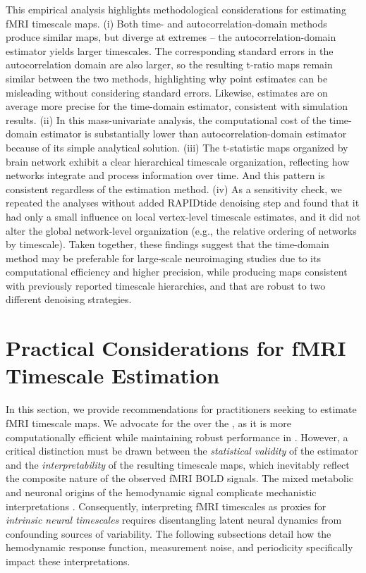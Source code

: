 \documentclass[9pt]{article}
\begin{document}
This empirical analysis highlights methodological considerations for estimating fMRI timescale maps. (i) Both time- and autocorrelation-domain methods produce similar maps, but diverge at extremes -- the autocorrelation-domain estimator yields larger timescales. The corresponding standard errors in the autocorrelation domain are also larger, so the resulting t-ratio maps remain similar between the two methods, highlighting why point estimates can be misleading without considering standard errors.  Likewise, estimates are on average more precise for the time-domain estimator, consistent with simulation results.  (ii) In this mass-univariate analysis, the computational cost of the time-domain estimator is substantially lower than autocorrelation-domain estimator because of its simple analytical solution. (iii) The t-statistic maps organized by brain network exhibit a clear hierarchical timescale organization, reflecting how networks integrate and process information over time. And this pattern is consistent regardless of the estimation method. (iv) As a sensitivity check, we repeated the analyses without added RAPIDtide denoising step and found that it had only a small influence on local vertex-level timescale estimates, and it did not alter the global network-level organization (e.g., the relative ordering of networks by timescale). Taken together, these findings suggest that the time-domain method may be preferable for large-scale neuroimaging studies due to its computational efficiency and higher precision, while producing maps consistent with previously reported timescale hierarchies, and that are robust to two different denoising strategies.

\section{Practical Considerations for fMRI Timescale Estimation}\label{sec:practical-considerations}

In this section, we provide recommendations for practitioners seeking to estimate fMRI timescale maps. We advocate for the  over the , as it is more computationally efficient while maintaining robust performance in . However, a critical distinction must be drawn between the \textit{statistical validity} of the estimator and the \textit{interpretability} of the resulting timescale maps, which inevitably reflect the composite nature of the observed fMRI BOLD signals. The mixed metabolic and neuronal origins of the hemodynamic signal complicate mechanistic interpretations \citep{raut_hierarchical_2020, he_scale-free_2011}. Consequently, interpreting fMRI timescales as proxies for \textit{intrinsic neural timescales} requires disentangling latent neural dynamics from confounding sources of variability. The following subsections detail how the hemodynamic response function, measurement noise, and periodicity specifically impact these interpretations.
\end{document}
